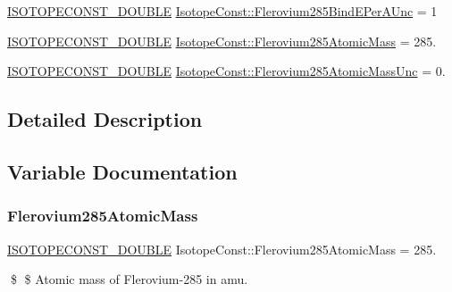 \begin{DoxyCompactItemize}
\mbox{\hyperlink{group___isotope_const-_macros_ga8f45a7272ce02c0b4c65c44636ed719a}{I\+S\+O\+T\+O\+P\+E\+C\+O\+N\+S\+T\+\_\+\+D\+O\+U\+B\+LE}} \mbox{\hyperlink{group___isotope_const-_flerovium-_fl285_gabf8b3447cb34ed5723806cada368251f}{Isotope\+Const\+::\+Flerovium285\+Bind\+E\+Per\+A\+Unc}} = 1
\item 
\mbox{\hyperlink{group___isotope_const-_macros_ga8f45a7272ce02c0b4c65c44636ed719a}{I\+S\+O\+T\+O\+P\+E\+C\+O\+N\+S\+T\+\_\+\+D\+O\+U\+B\+LE}} \mbox{\hyperlink{group___isotope_const-_flerovium-_fl285_gade37771c89a178c8b2b587c8f9d9c47f}{Isotope\+Const\+::\+Flerovium285\+Atomic\+Mass}} = 285.
\item 
\mbox{\hyperlink{group___isotope_const-_macros_ga8f45a7272ce02c0b4c65c44636ed719a}{I\+S\+O\+T\+O\+P\+E\+C\+O\+N\+S\+T\+\_\+\+D\+O\+U\+B\+LE}} \mbox{\hyperlink{group___isotope_const-_flerovium-_fl285_ga493c43cddd82f45853e05cbcea9098a9}{Isotope\+Const\+::\+Flerovium285\+Atomic\+Mass\+Unc}} = 0.
\end{DoxyCompactItemize}


\subsection{Detailed Description}


\subsection{Variable Documentation}
\mbox{\label{group___isotope_const-_flerovium-_fl285_gade37771c89a178c8b2b587c8f9d9c47f}} 
\subsubsection{\texorpdfstring{Flerovium285\+Atomic\+Mass}{Flerovium285AtomicMass}}
{\footnotesize\ttfamily \mbox{\hyperlink{group___isotope_const-_macros_ga8f45a7272ce02c0b4c65c44636ed719a}{I\+S\+O\+T\+O\+P\+E\+C\+O\+N\+S\+T\+\_\+\+D\+O\+U\+B\+LE}} Isotope\+Const\+::\+Flerovium285\+Atomic\+Mass = 285.}

\$ \$ Atomic mass of Flerovium-\/285 in amu. \mbox{\label{group___isotope_const-_flerovium-_fl285_ga493c43cddd82f45853e05cbcea9098a9}} 
